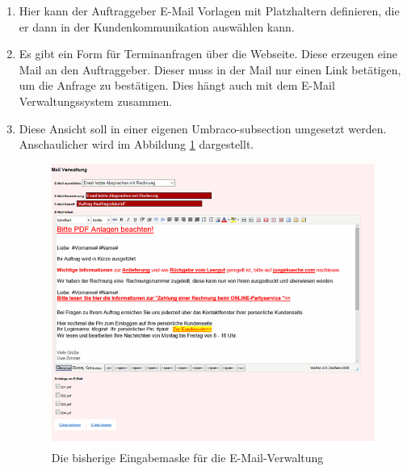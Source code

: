 \begin{enumerate}
	\item Hier kann der Auftraggeber E-Mail Vorlagen mit Platzhaltern definieren, die er dann in der Kundenkommunikation auswählen kann.
	\item Es gibt ein Form für Terminanfragen über die Webseite. Diese erzeugen eine Mail an den Auftraggeber. Dieser muss in der Mail nur einen Link betätigen, um die Anfrage zu bestätigen. Dies hängt auch mit dem E-Mail Verwaltungssystem zusammen.
	\item Diese Ansicht soll in einer eigenen Umbraco-subsection umgesetzt werden.
	Anschaulicher wird im Abbildung \ref{fig:email} dargestellt.
	
	\begin{figure}[h]
	\centering
	\includegraphics[width=0.5\linewidth]{Graphics/email.png}
	\caption[E-Mail-Verwaltung]{Die bisherige Eingabemaske für die E-Mail-Verwaltung}
	\label{fig:email}
\end{figure}
\end{enumerate} 



